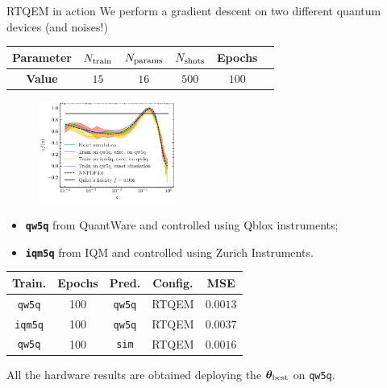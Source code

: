 \documentclass[aspectratio=169, 8pt, xcolor={svgnames}, hyperref={linkcolor=black}]{beamer}
\begin{document}
\begin{frame}{RTQEM in action}
We perform a gradient descent on two different quantum devices (and noises!)
\begin{center}
\begin{tabular}{cccccc}
\hline \hline 
\rule{0pt}{2.5ex}
\textbf{Parameter} & $N_{\rm train}$ & $N_{\rm params}$ & $N_{\rm shots}$ & Epochs \\
\hline
\rule{0pt}{2.5ex}
\textbf{Value} & $15$ & $16$ & $500$ & $100$ \\
\hline \hline 
\end{tabular}
\end{center}
\begin{multicols}{2}

\begin{figure}
    \includegraphics[width=0.4\textwidth]{figures/100.pdf}%
\end{figure}
\begin{center}
\begin{itemize}[noitemsep]
  \item[\faCog] \textbf{\texttt{qw5q}} from QuantWare and controlled using Qblox instruments;
  \item[\faCog] \textbf{\texttt{iqm5q}} from IQM and controlled using Zurich Instruments.
\end{itemize}
\footnotesize
\begin{table}
\begin{tabular}{ccccc}
\hline \hline 
\textbf{Train.} & \textbf{Epochs} & \textbf{Pred.} &  \textbf{Config.} & MSE \\
\hline    
\texttt{qw5q} & 100 & \texttt{qw5q} & RTQEM & $0.0013$  \\     
\texttt{iqm5q} & 100 & \texttt{qw5q} & RTQEM & $0.0037$ \\   
\texttt{qw5q} & 100& \texttt{sim} & RTQEM & $0.0016$ \\   
\hline \hline
\end{tabular}
\centering
\end{table}
\end{center}
\end{multicols}
All the hardware results are obtained deploying the $\bm{\theta}_{\rm best}$ on 
\texttt{qw5q}.
\end{frame}
\end{document}
